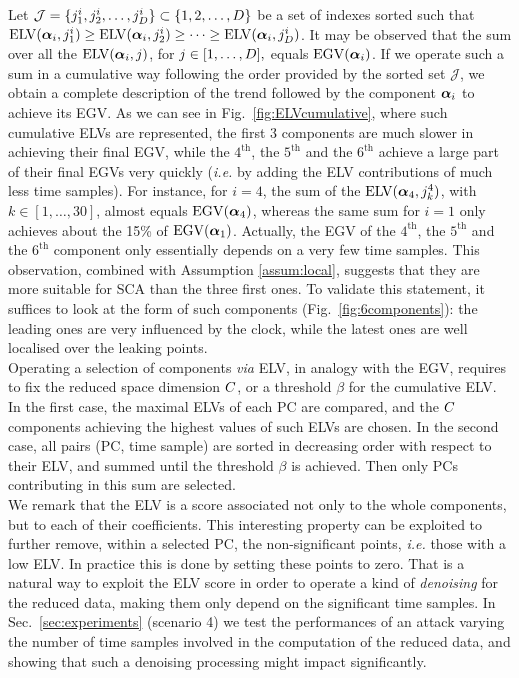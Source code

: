 Let $\mathcal{J}=\{j^i_1, j^i_2, \dots, j^i_{D}\}\subset\{1,2,\dots,D\}$ be a set of indexes sorted such that $\mathrm{ELV}(\boldsymbol{\alpha}_i,j^i_1)\geq \mathrm{ELV}(\boldsymbol{\alpha}_i,j^i_2)\geq \dots \geq \mathrm{ELV}(\boldsymbol{\alpha}_i,j^i_D)$.
It may be observed that the sum over all the $\mathrm{ELV}(\boldsymbol{\alpha}_i,j)$, for $j\in[1,\dots,D],$   equals $\mathrm{EGV}(\boldsymbol{\alpha}_i)$. If we operate such a sum in a cumulative way following the order provided by the sorted set $\mathcal{J}$, we obtain a complete description of the trend followed by the component $\boldsymbol{\alpha}_i$ to achieve its EGV. As we can see in Fig.~\ref{fig:ELVcumulative}, where such cumulative ELVs are represented, the first 3 components are much slower in achieving their final EGV, while the $4^\text{th}$, the $5^\text{th}$ and the $6^\text{th}$ achieve a large part of their final EGVs very quickly ({\em i.e.} by adding the ELV contributions of much less time samples). For instance, for $i=4$, the sum of the $\mathrm{ELV}(\boldsymbol{\alpha}_4, j^4_k)$, with $k\in[1,\dots,30]$, almost equals $\mathrm{EGV}(\boldsymbol{\alpha}_4)$, whereas the same sum for $i=1$ only achieves about the 15\% of $\mathrm{EGV}(\boldsymbol{\alpha}_1)$. Actually, the EGV of the $4^\text{th}$, the $5^\text{th}$ and the $6^\text{th}$ component only essentially depends on a very few time samples. This observation, combined with Assumption \ref{assum:local}, suggests that they are more suitable for SCA than the three first ones. To validate this statement, it suffices to look at the form of such components (Fig.~\ref{fig:6components}): the leading ones are very influenced by the clock, while the latest ones are well localised over the leaking points.\\

Operating a selection of components {\em via} ELV, in analogy with the EGV, requires to fix the reduced space dimension $C$, or a threshold $\beta$ for the cumulative ELV. In the first case, the maximal ELVs of each PC are compared, and the $C$ components achieving the highest values of such ELVs are chosen. In the second case, all pairs (PC, time sample) are sorted in decreasing order with respect to their ELV, and summed until the threshold $\beta$ is achieved. Then only PCs contributing in this sum are selected. \\

We remark that the ELV is a score associated not only to the whole components, but to each of their coefficients. This interesting property can be exploited to further remove, within a selected PC, the non-significant points, {\em i.e.} those with a low ELV. In practice this is done by setting these points to zero. That is a natural way to exploit the ELV score in order to operate a kind of {\em denoising} for the reduced data, making them only depend  on the significant time samples. In Sec.~\ref{sec:experiments} (scenario 4) we test the performances of an attack varying the number of time samples involved in the computation of the reduced data, and showing that such a denoising processing might impact significantly. 



